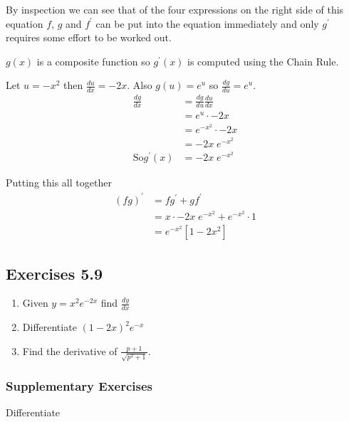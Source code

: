By inspection we can see that of the four expressions on the right side of this equation $f$, $g$ and $f^{ \prime }$ can be put into the equation immediately and only $g^{ \prime }$ requires some effort to be worked out. 

$g (x)$ is a composite function so $g^{ \prime } (x)$ is computed using the Chain Rule. 

Let $u = -x^{2}$ then $\frac{d u}{d x} = -2 x$. Also $g (u) =e^{u}$ so $\frac{d g}{d u} =e^{u}$.
\begin{align*}\frac{d g}{d x} &  = \frac{d g}{d u} \frac{d u}{d x} \\
 &  = e^{u} \cdot  -2 x \\
 &  = e^{ -x^{2}} \cdot  -2 x \\
 &  =  -2 x\; e^{ -x^{2}} \\
\text{So}g^{ \prime } (x) &  =  -2 x\; e^{ -x^{2}}\end{align*}

Putting this all together
\begin{align*}\left (f g\right )^{ \prime } &  = f g^{ \prime } +g f^{ \prime } \\
 &  = x \cdot  -2 x\; e^{ -x^{2}} +e^{ -x^{2}} \cdot 1 \\
 &  = e^{ -x^{2}} \left [1 -2 x^{2}\right ]\end{align*}

\subsection{Exercises 5.9}
\begin{enumerate}
\item Given $y =x^{2} e^{ -2 x}$ find $\frac{d y}{d x}$ 

\item Differentiate $\left (1 -2 x\right )^{2} e^{ -x}$ 

\item Find the derivative of $\frac{p +1}{\sqrt{p^{2} +1}}$. \end{enumerate}


\subsubsection{Supplementary Exercises}
Differentiate 


